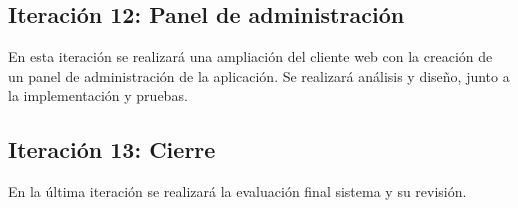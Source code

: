 \subsection{Iteración 12: Panel de administración}
En esta iteración se realizará una ampliación del cliente web con la creación de un panel de administración de la aplicación. Se realizará análisis y diseño, junto a la implementación y pruebas.


\subsection{Iteración 13: Cierre}
En la última iteración se realizará la evaluación final sistema y su revisión.





